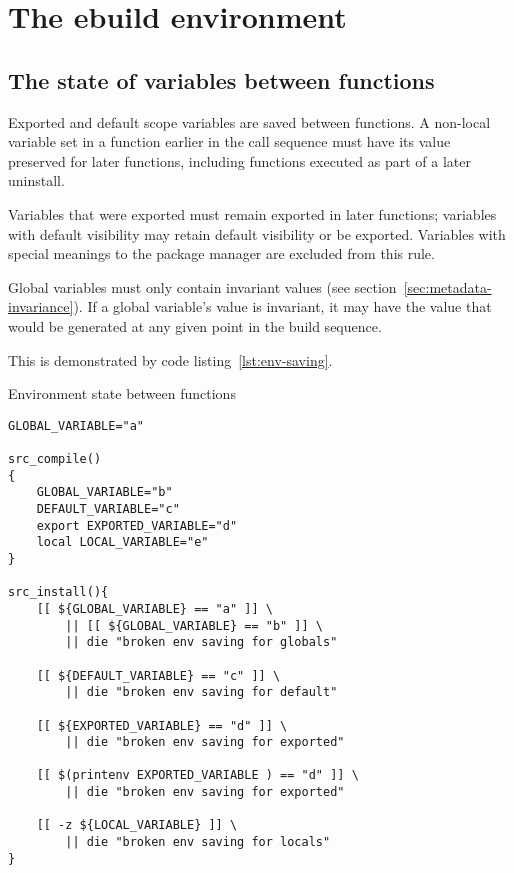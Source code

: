 \chapter{The ebuild environment}



\section{The state of variables between functions}
\label{sec:ebuild-env-state}

Exported and default scope variables are saved between functions. A non-local variable set in a
function earlier in the call sequence must have its value preserved for later functions, including
functions executed as part of a later uninstall.


Variables that were exported must remain exported in later functions; variables with default
visibility may retain default visibility or be exported. Variables with special meanings to the
package manager are excluded from this rule.

Global variables must only contain invariant values (see section~\ref{sec:metadata-invariance}).
If a global variable's value is invariant, it may have the value that would be generated at any
given point in the build sequence.

This is demonstrated by code listing~\ref{lst:env-saving}.

\begin{listing}
\caption{Environment state between functions} \label{lst:env-saving}
\begin{verbatim}
GLOBAL_VARIABLE="a"

src_compile()
{
    GLOBAL_VARIABLE="b"
    DEFAULT_VARIABLE="c"
    export EXPORTED_VARIABLE="d"
    local LOCAL_VARIABLE="e"
}

src_install(){
    [[ ${GLOBAL_VARIABLE} == "a" ]] \
        || [[ ${GLOBAL_VARIABLE} == "b" ]] \
        || die "broken env saving for globals"

    [[ ${DEFAULT_VARIABLE} == "c" ]] \
        || die "broken env saving for default"

    [[ ${EXPORTED_VARIABLE} == "d" ]] \
        || die "broken env saving for exported"

    [[ $(printenv EXPORTED_VARIABLE ) == "d" ]] \
        || die "broken env saving for exported"

    [[ -z ${LOCAL_VARIABLE} ]] \
        || die "broken env saving for locals"
}
\end{verbatim}
\end{listing}

